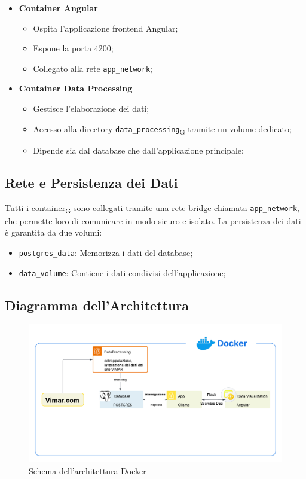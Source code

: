 \begin{itemize}
    \item \textbf{Container Angular}
    \begin{itemize}
        \item Ospita l'applicazione frontend Angular;
        \item Espone la porta 4200;
        \item Collegato alla rete \texttt{app\_network};
    \end{itemize}

    \item \textbf{Container Data Processing}
    \begin{itemize}
        \item Gestisce l'elaborazione dei dati;
        \item Accesso alla directory \texttt{data\_processing}\textsubscript{G} tramite un volume dedicato;
        \item Dipende sia dal database che dall'applicazione principale;
    \end{itemize}
\end{itemize}

\subsection{Rete e Persistenza dei Dati}

Tutti i container\textsubscript{G} sono collegati tramite una rete bridge chiamata \texttt{app\_network}, che permette loro di comunicare in modo sicuro e isolato. La persistenza dei dati è garantita da due volumi:

\begin{itemize}
    \item \texttt{postgres\_data}: Memorizza i dati del database;
    \item \texttt{data\_volume}: Contiene i dati condivisi dell'applicazione;
\end{itemize}

\subsection{Diagramma dell'Architettura}
\begin{figure}[H]
    \centering
    \includegraphics[width=\textwidth]{images/esagonale.png}
    \caption{Schema dell'architettura Docker}
\end{figure}

